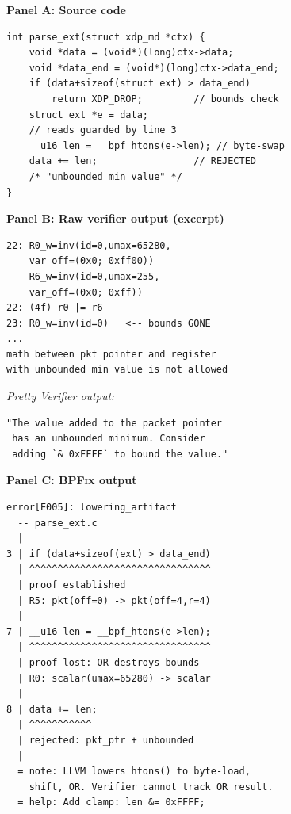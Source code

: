 \documentclass[sigplan,10pt,anonymous,review]{acmart}
\newcommand{\sys}{\textsc{BPFix}\xspace}
\begin{document}
\begin{figure}[t]
\begin{minipage}[t]{0.31\linewidth}
\textbf{Panel A: Source code}
\vspace{2pt}
\begin{lstlisting}[style=ccode, firstnumber=1]
int parse_ext(struct xdp_md *ctx) {
    void *data = (void*)(long)ctx->data;
    void *data_end = (void*)(long)ctx->data_end;
    if (data+sizeof(struct ext) > data_end)
        return XDP_DROP;         // bounds check
    struct ext *e = data;
    // reads guarded by line 3
    __u16 len = __bpf_htons(e->len); // byte-swap
    data += len;                 // REJECTED
    /* "unbounded min value" */
}
\end{lstlisting}
\end{minipage}%
\hfill
\begin{minipage}[t]{0.33\linewidth}
\textbf{Panel B: Raw verifier output (excerpt)}
\vspace{2pt}
\begin{lstlisting}[style=verifier]
22: R0_w=inv(id=0,umax=65280,
    var_off=(0x0; 0xff00))
    R6_w=inv(id=0,umax=255,
    var_off=(0x0; 0xff))
22: (4f) r0 |= r6
23: R0_w=inv(id=0)   <-- bounds GONE
...
math between pkt pointer and register
with unbounded min value is not allowed
\end{lstlisting}
\vspace{2pt}
\textit{Pretty Verifier output:}
\begin{lstlisting}[style=verifier]
"The value added to the packet pointer
 has an unbounded minimum. Consider
 adding `& 0xFFFF` to bound the value."
\end{lstlisting}
\end{minipage}%
\hfill
\begin{minipage}[t]{0.33\linewidth}
\textbf{Panel C: \sys output}
\vspace{2pt}
\begin{lstlisting}[style=verifier]
error[E005]: lowering_artifact
  -- parse_ext.c
  |
3 | if (data+sizeof(ext) > data_end)
  | ^^^^^^^^^^^^^^^^^^^^^^^^^^^^^^^^
  | proof established
  | R5: pkt(off=0) -> pkt(off=4,r=4)
  |
7 | __u16 len = __bpf_htons(e->len);
  | ^^^^^^^^^^^^^^^^^^^^^^^^^^^^^^^^
  | proof lost: OR destroys bounds
  | R0: scalar(umax=65280) -> scalar
  |
8 | data += len;
  | ^^^^^^^^^^^
  | rejected: pkt_ptr + unbounded
  |
  = note: LLVM lowers htons() to byte-load,
    shift, OR. Verifier cannot track OR result.
  = help: Add clamp: len &= 0xFFFF;
\end{lstlisting}

\end{minipage}
\end{figure}
\end{document}
